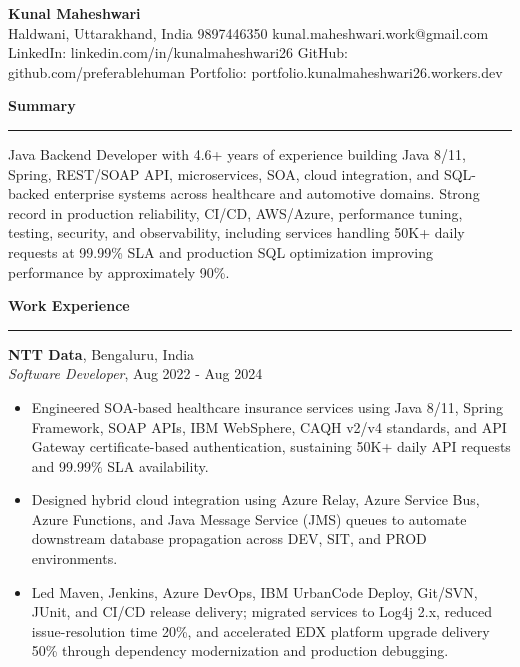 \documentclass[10pt,letterpaper]{article}
\newcommand{\ressection}[1]{%
  \vspace{3pt}\par\textbf{#1}\par\vspace{1pt}\hrule\vspace{2pt}
}
\begin{document}
\pagestyle{empty}
\raggedright
\fontsize{9.2}{9.85}\selectfont

{\Large \textbf{Kunal Maheshwari}}\\
Haldwani, Uttarakhand, India \textbar{} 9897446350 \textbar{} kunal.maheshwari.work@gmail.com\\
LinkedIn: linkedin.com/in/kunalmaheshwari26 \textbar{} GitHub: github.com/preferablehuman \textbar{} Portfolio: portfolio.kunalmaheshwari26.workers.dev

\ressection{Summary}
Java Backend Developer with 4.6+ years of experience building Java 8/11, Spring, REST/SOAP API, microservices, SOA, cloud integration, and SQL-backed enterprise systems across healthcare and automotive domains. Strong record in production reliability, CI/CD, AWS/Azure, performance tuning, testing, security, and observability, including services handling 50K+ daily requests at 99.99\% SLA and production SQL optimization improving performance by approximately 90\%.

\ressection{Work Experience}

\textbf{NTT Data}, Bengaluru, India\\
\textit{Software Developer}, Aug 2022 - Aug 2024
\begin{itemize}
  \item Engineered SOA-based healthcare insurance services using Java 8/11, Spring Framework, SOAP APIs, IBM WebSphere, CAQH v2/v4 standards, and API Gateway certificate-based authentication, sustaining 50K+ daily API requests and 99.99\% SLA availability.
  \item Designed hybrid cloud integration using Azure Relay, Azure Service Bus, Azure Functions, and Java Message Service (JMS) queues to automate downstream database propagation across DEV, SIT, and PROD environments.
  \item Led Maven, Jenkins, Azure DevOps, IBM UrbanCode Deploy, Git/SVN, JUnit, and CI/CD release delivery; migrated services to Log4j 2.x, reduced issue-resolution time 20\%, and accelerated EDX platform upgrade delivery 50\% through dependency modernization and production debugging.
\end{itemize}
\end{document}
